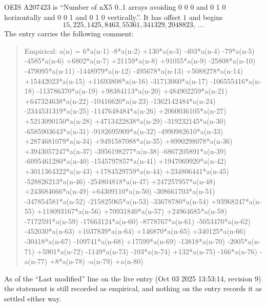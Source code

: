 \documentclass[11pt,a4paper]{article}
\theoremstyle{plain}
\theoremstyle{definition}
\begin{document}
OEIS A207423 is ``Number of nX5 0..1 arrays avoiding 0 0 0 and 0 1 0 horizontally and 0 0 1 and 0 1 0 vertically.''. It has offset
$1$ and begins
\[
15, 225, 1425, 8463, 55361, 341329, 2048823,\ \dots
\]
The entry carries the following comment:
\begin{quote}\small
Empirical: a(n) = 6*a(n-1) -8*a(n-2) +130*a(n-3) -403*a(n-4) -79*a(n-5) -4585*a(n-6) +6802*a(n-7) +21159*a(n-8) +91055*a(n-9) -25808*a(n-10) -479095*a(n-11) -1448979*a(n-12) -495678*a(n-13) +5088278*a(n-14) +15442023*a(n-15) +11693808*a(n-16) -31713060*a(n-17) -106555416*a(n-18) -113786370*a(n-19) +98384113*a(n-20) +484902259*a(n-21) +647324638*a(n-22) -10416620*a(n-23) -1362142484*a(n-24) -2344531319*a(n-25) -1147648484*a(n-26) +2060036105*a(n-27) +5213090150*a(n-28) +4713422838*a(n-29) -319232145*a(n-30) -6585903643*a(n-31) -9182695909*a(n-32) -4990982610*a(n-33) +2874681079*a(n-34) +9491587088*a(n-35) +8990298078*a(n-36) +3943057247*a(n-37) -3956198277*a(n-38) -6867205891*a(n-39) -6095461280*a(n-40) -1545797857*a(n-41) +1947069920*a(n-42) +3011364322*a(n-43) +1784529759*a(n-44) +234806441*a(n-45) -528826213*a(n-46) -254804818*a(n-47) +247257957*a(n-48) +243684666*a(n-49) +64309110*a(n-50) -308661703*a(n-51) -347854581*a(n-52) -215825965*a(n-53) -33678780*a(n-54) +93968247*a(n-55) +118093167*a(n-56) +70931840*a(n-57) +24964685*a(n-58) -7172591*a(n-59) -17663124*a(n-60) -8778767*a(n-61) -5053470*a(n-62) -452030*a(n-63) +1037839*a(n-64) +146870*a(n-65) +340125*a(n-66) -30418*a(n-67) -109741*a(n-68) +17599*a(n-69) -13818*a(n-70) -2005*a(n-71) +5901*a(n-72) -1149*a(n-73) -103*a(n-74) +132*a(n-75) -166*a(n-76) -a(n-77) +8*a(n-78) -a(n-79) +a(n-80)
\end{quote}
As of the ``Last modified'' line on the live entry (Oct 03 2025 13:53:14, revision
9) the statement is still recorded as empirical, and nothing on the entry
records it as settled either way.
\end{document}
